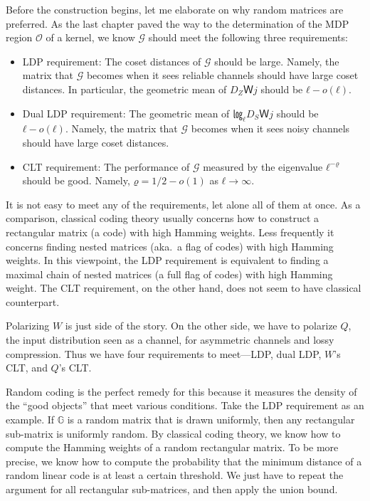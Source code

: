 \documentclass[openany]{amsbook}
\numberwithin{equation}{chapter}
\numberwithin{figure}{chapter}
\numberwithin{table}{chapter}
\theoremstyle{definition}	理dfn:Definition~?s			理exa:Example~?s
\theoremstyle{remark}		理cla:Claim~?s				理rem:Remark~?s
\begin{document}
	Before the construction begins, let me elaborate on
	why random matrices are preferred.
	As the last chapter paved the way to
	the determination of the MDP region $𝒪$ of a kernel,
	we know $𝒢$ should meet the following three requirements:
	\begin{itemize}
		\item	LDP requirement:
				The coset distances of $𝒢$ should be large.
				Namely, the matrix that $𝒢$ becomes when it sees reliable channels
				should have large coset distances.
				In particular, the geometric mean of $D_ZＷj$ should be $ℓ-o(ℓ)$.
		\item	Dual LDP requirement:
				The geometric mean of $㏒_ℓD_SＷj$ should be $ℓ-o(ℓ)$.
				Namely, the matrix that $𝒢$ becomes when it sees noisy channels
				should have large coset distances.
		\item	CLT requirement:
				The performance of $𝒢$ measured by
				the eigenvalue $ℓ^{-ϱ}$ should be good.
				Namely, $ϱ=1/2-o(1)$ as $ℓ→∞$.
	\end{itemize}
	
	It is not easy to meet any of the requirements, let alone all of them at once.
	As a comparison, classical coding theory usually concerns
	how to construct a rectangular matrix (a code) with high Hamming weights.
	Less frequently it concerns finding nested matrices
	(aka.\ a flag of codes) with high Hamming weights.
	In this viewpoint, the LDP requirement is equivalent to finding a maximal chain
	of nested matrices (a full flag of codes) with high Hamming weight.
	The CLT requirement, on the other hand, does not seem to have classical counterpart.
	
	Polarizing $W$ is just side of the story.
	On the other side, we have to polarize $Q$, the input distribution
	seen as a channel, for asymmetric channels and lossy compression.
	Thus we have four requirements to meet---LDP, dual LDP, $W$'s CLT, and $Q$'s CLT.
	
	Random coding is the perfect remedy for this because it measures
	the density of the “good objects” that meet various conditions.
	Take the LDP requirement as an example.
	If $𝔾$ is a random matrix that is drawn uniformly,
	then any rectangular sub-matrix is uniformly random.
	By classical coding theory, we know how to compute
	the Hamming weights of a random rectangular matrix.
	To be more precise, we know how to compute the probability that the minimum distance
	of a random linear code is at least a certain threshold.
	We just have to repeat the argument for all rectangular sub-matrices,
	and then apply the union bound.
	
\end{document}

